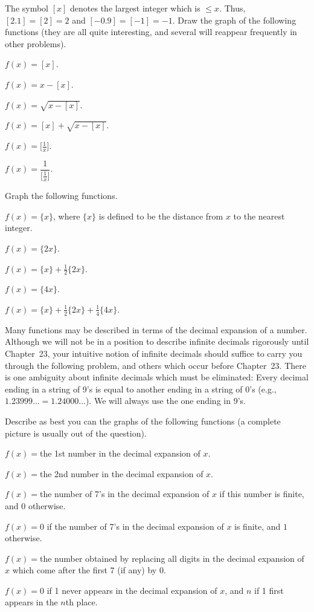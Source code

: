  The symbol $[x]$ denotes the largest integer which is $\leq x$.
Thus, $[2.1]=[2]=2$ and $[-0.9]=[-1]=-1$. Draw the graph of the following
functions (they are all quite interesting, and several will reappear frequently
in other problems).
\begin{romans}
\item $f(x)=[x]$.
\item $f(x)=x-[x]$.
\item $f(x)=\sqrt{x-[x]}$.
\item $f(x)=[x]+\sqrt{x-[x]}$.
\item $f(x)=\bigl[\frac1x\bigr]$.
\item $f(x)=\dfrac{1}{\bigl[\frac1x\bigr]}$.
\end{romans}

 Graph the following functions.
\begin{romans}
\item $f(x)=\{x\}$, where $\{x\}$ is defined to be the distance from $x$ to the
  nearest integer.
\item $f(x)=\{2x\}$.
\item $f(x)=\{x\}+\frac12\{2x\}$.
\item $f(x)=\{4x\}$.
\item $f(x)=\{x\}+\frac12\{2x\}+\frac14\{4x\}$.
\end{romans}

Many functions may be described in terms of the decimal expansion of a number.
Although we will not be in a position to describe infinite decimals rigorously
until Chapter~23, your intuitive notion of infinite decimals should suffice to
carry you through the following problem, and others which occur before
Chapter~23. There is one ambiguity about infinite decimals which must be
eliminated: Every decimal ending in a string of 9's is equal to another ending
in a string of 0's (e.g., $1.23999\ldots=1.24000\ldots$). We will always use
the one ending in 9's.

 Describe as best you can the graphs of the following functions (a
complete picture is usually out of the question).
\begin{romans}
\item $f(x)={}$the 1st number in the decimal expansion of $x$.
\item $f(x)={}$the 2nd number in the decimal expansion of $x$.
\item $f(x)={}$the number of 7's in the decimal expansion of $x$ if this number
  is finite, and $0$ otherwise.
\item $f(x)=0$ if the number of 7's in the decimal expansion of $x$ is finite,
  and $1$ otherwise.
\item $f(x)={}$the number obtained by replacing all digits in the decimal
  expansion of $x$ which come after the first 7 (if any) by $0$.
\item $f(x)=0$ if 1 never appears in the decimal expansion of $x$, and $n$ if 1
  first appears in the $n$th place.
\end{romans}

